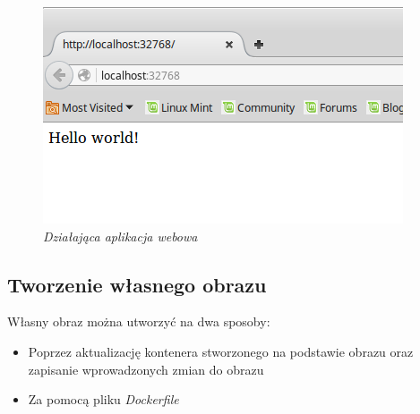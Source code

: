 \begin{figure}[!h]
    \begin{center}
    \includegraphics[angle=0,scale=0.75]{img/docker.png}
    \end{center}
    \caption{\em Działająca aplikacja webowa}
    \label{fig:webapp}
\end{figure}

\subsection{Tworzenie własnego obrazu}

Własny obraz można utworzyć na dwa sposoby:
\begin{itemize}
\item Poprzez aktualizację kontenera stworzonego na podstawie obrazu oraz zapisanie wprowadzonych zmian do obrazu
\item Za pomocą pliku \textit{Dockerfile}
\end{itemize}

